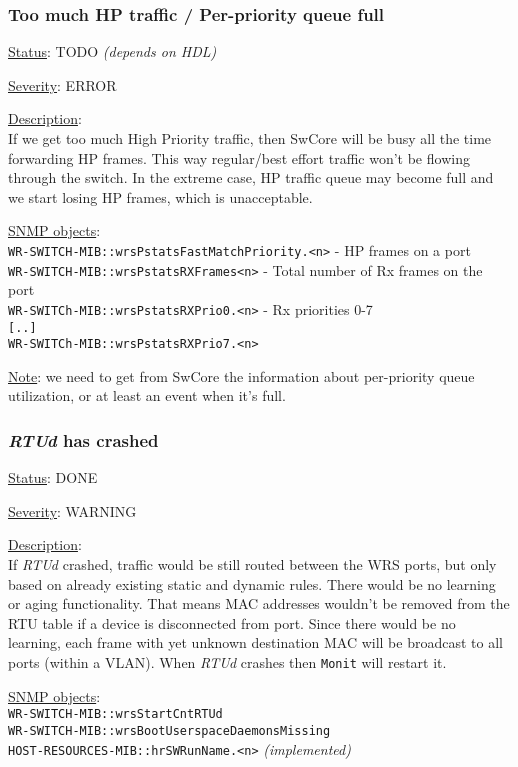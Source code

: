 \subsubsection{\bf Too much HP traffic / Per-priority queue full}
		\label{fail:data:too_much_HP}
		\begin{packed_enum}
			\item [] \underline{Status}: TODO \emph{(depends on HDL)}
			\item [] \underline{Severity}: ERROR
			\item [] \underline{Description}:\\
				If we get too much High Priority traffic, then SwCore will be busy all
				the time forwarding HP frames. This way regular/best effort traffic
				won't be flowing through the switch. In the extreme case, HP traffic
				queue may become full and we start losing HP frames, which is
				unacceptable.
			\item [] \underline{SNMP objects}:\\
				\texttt{WR-SWITCH-MIB::wrsPstatsFastMatchPriority.<n>} - HP frames on a port\\
				\texttt{WR-SWITCH-MIB::wrsPstatsRXFrames<n>} - Total number of Rx frames on
				the port\\
				\texttt{WR-SWITCh-MIB::wrsPstatsRXPrio0.<n>} - Rx priorities 0-7\\
				\texttt{[..]}\\
				\texttt{WR-SWITCh-MIB::wrsPstatsRXPrio7.<n>}
			\item [] \underline{Note}: we need to get from SwCore the information
				about per-priority queue utilization, or at least an event when it's
				full.
		\end{packed_enum}

\subsubsection{\bf \emph{RTUd} has crashed}
		\label{fail:data:rtu_crash}
		\begin{packed_enum}
			\item [] \underline{Status}: DONE
			\item [] \underline{Severity}: WARNING
			\item [] \underline{Description}:\\
				If \emph{RTUd} crashed, traffic would be still routed between the WRS ports, but
				only based on already existing static and dynamic rules. There would be
				no learning or aging functionality. That means MAC addresses wouldn't be
				removed from the RTU table if a device is disconnected from port. Since
				there would be no learning, each frame with yet unknown destination MAC
				will be broadcast to all ports (within a VLAN).
				When \emph{RTUd} crashes then \texttt{Monit} will restart it.
			\item [] \underline{SNMP objects}:\\
				\texttt{WR-SWITCH-MIB::wrsStartCntRTUd}\\
				\texttt{WR-SWITCH-MIB::wrsBootUserspaceDaemonsMissing}\\
				\texttt{HOST-RESOURCES-MIB::hrSWRunName.<n>} \emph{(implemented)}
		\end{packed_enum}

